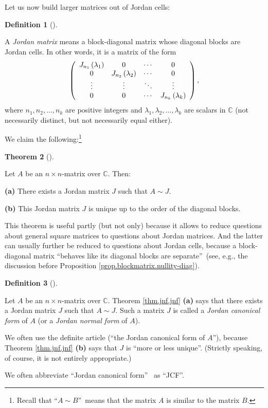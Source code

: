 \documentclass[numbers=enddot,12pt,final,onecolumn,notitlepage]{scrartcl}%
\numberwithin{exer}{subsection}
\theoremstyle{definition}
\newtheorem{theo}{Theorem}[subsection]
\newenvironment{theorem}[1][]
{\begin{theo}[#1]\begin{leftbar}}
{\end{leftbar}\end{theo}}
\newtheorem{defi}[theo]{Definition}
\newenvironment{definition}[1][]
{\begin{defi}[#1]\begin{leftbar}}
{\end{leftbar}\end{defi}}
\begin{document}
Let us now build larger matrices out of Jordan cells:

\begin{definition}
\label{def.jnf.jmat}A \emph{Jordan matrix} means a block-diagonal matrix whose
diagonal blocks are Jordan cells. In other words, it is a matrix of the form%
\[
\left(
\begin{array}
[c]{cccc}%
J_{n_{1}}\left(  \lambda_{1}\right)  & 0 & \cdots & 0\\
0 & J_{n_{2}}\left(  \lambda_{2}\right)  & \cdots & 0\\
\vdots & \vdots & \ddots & \vdots\\
0 & 0 & \cdots & J_{n_{k}}\left(  \lambda_{k}\right)
\end{array}
\right)  ,
\]
where $n_{1},n_{2},\ldots,n_{k}$ are positive integers and $\lambda
_{1},\lambda_{2},\ldots,\lambda_{k}$ are scalars in $\mathbb{C}$ (not
necessarily distinct, but not necessarily equal either).
\end{definition}

We claim the following:\footnote{Recall that \textquotedblleft$A\sim
B$\textquotedblright\ means that the matrix $A$ is similar to the matrix $B$.}

\begin{theorem}
[Jordan canonical form theorem]\label{thm.jnf.jnf}Let $A$ be an $n\times
n$-matrix over $\mathbb{C}$. Then:

\textbf{(a)} There exists a Jordan matrix $J$ such that $A\sim J$.

\textbf{(b)} This Jordan matrix $J$ is unique up to the order of the diagonal blocks.
\end{theorem}

This theorem is useful partly (but not only) because it allows to reduce
questions about general square matrices to questions about Jordan matrices.
And the latter can usually further be reduced to questions about Jordan cells,
because a block-diagonal matrix \textquotedblleft behaves like its diagonal
blocks are separate\textquotedblright\ (see, e.g., the discussion before
Proposition \ref{prop.blockmatrix.nullity-diag}).

\begin{definition}
\label{def.jnf.jnf}Let $A$ be an $n\times n$-matrix over $\mathbb{C}$. Theorem
\ref{thm.jnf.jnf} \textbf{(a)} says that there exists a Jordan matrix $J$ such
that $A\sim J$. Such a matrix $J$ is called a \emph{Jordan canonical form} of
$A$ (or a \emph{Jordan normal form} of $A$).

We often use the definite article (\textquotedblleft the Jordan canonical form
of $A$\textquotedblright), because Theorem \ref{thm.jnf.jnf} \textbf{(b)} says
that $J$ is \textquotedblleft more or less unique\textquotedblright. (Strictly
speaking, of course, it is not entirely appropriate.)

We often abbreviate \textquotedblleft Jordan canonical form\textquotedblright%
\ as \textquotedblleft JCF\textquotedblright.
\end{definition}
\end{document}
